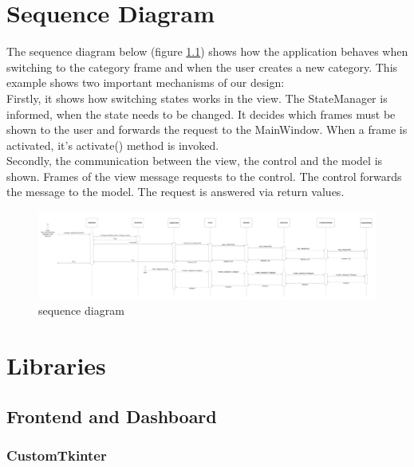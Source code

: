 \documentclass[letterpaper,10pt,english]{sphinxmanual}
\begin{document}
\chapter{Sequence Diagram}
\label{\detokenize{index:sequence-diagrams}}
\sphinxstepscope
The sequence diagram below (figure \ref{fig:sequencediagram}) shows how the application behaves when switching to the category frame and when the user creates a new category. This example shows two important mechanisms of our design:\\
Firstly, it shows how switching states works in the view. The StateManager is informed, when the state needs to be changed. It decides which frames must be shown to the user and forwards the request to the MainWindow. When a frame is activated, it's activate() method is invoked. \\
Secondly, the communication between the view, the control and the model is shown. Frames of the view message requests to the control. The control forwards the message to the model. The request is answered via return values.

\begin{figure}
\centering
\includegraphics[width=1\textwidth]
        {pictures/sequenzdiagramm.png}
  \caption{sequence diagram}
  \label{fig:sequencediagram}
\end{figure}


\newpage%


\chapter{Libraries}
\label{\detokenize{index:libaries}}
\sphinxstepscope

\section{Frontend and Dashboard}

\subsection{CustomTkinter}
\end{document}
